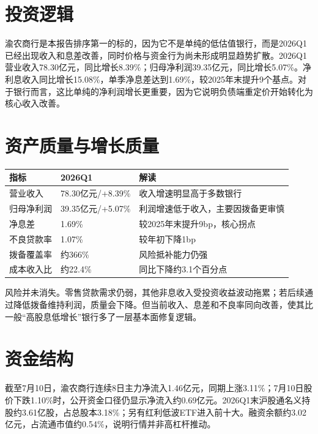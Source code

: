 \section{投资逻辑}

渝农商行是本报告排序第一的标的，因为它不是单纯的低估值银行，而是2026Q1已经出现收入和息差改善，同时价格与资金行为尚未形成明显趋势扩散。2026Q1营业收入78.30亿元，同比增长8.39\%；归母净利润39.35亿元，同比增长5.07\%。净利息收入同比增长15.08\%，单季净息差达到1.69\%，较2025年末提升9个基点。对于银行而言，这比单纯的净利润增长更重要，因为它说明负债端重定价开始转化为核心收入改善。

\section{资产质量与增长质量}

\begin{exhibitbox}
\begin{tabularx}{\textwidth}{L{3.6cm}R{2.5cm}X}
\toprule
\textbf{指标} & \textbf{2026Q1} & \textbf{解读} \\
\midrule
营业收入 & 78.30亿元/+8.39\% & 收入增速明显高于多数银行 \\
归母净利润 & 39.35亿元/+5.07\% & 利润增速低于收入，主要因拨备更审慎 \\
净息差 & 1.69\% & 较2025年末提升9bp，核心拐点 \\
不良贷款率 & 1.07\% & 较年初下降1bp \\
拨备覆盖率 & 约366\% & 风险抵补能力仍强 \\
成本收入比 & 约22.4\% & 同比下降约3.1个百分点 \\
\bottomrule
\end{tabularx}
\end{exhibitbox}

风险并未消失。零售贷款需求仍弱，其他非息收入受投资收益波动拖累；若后续通过降低拨备维持利润，质量会下降。但当前收入、息差和不良率同向改善，使其比一般“高股息低增长”银行多了一层基本面修复逻辑。

\section{资金结构}

截至7月10日，渝农商行连续8日主力净流入1.46亿元，同期上涨3.11\%；7月10日股价下跌1.10\%时，公开资金口径仍显示净流入约0.69亿元。2026Q1末沪股通名义持股约3.61亿股，占总股本3.18\%；另有红利低波ETF进入前十大。融资余额约3.02亿元，占流通市值约0.54\%，说明行情并非高杠杆推动。

